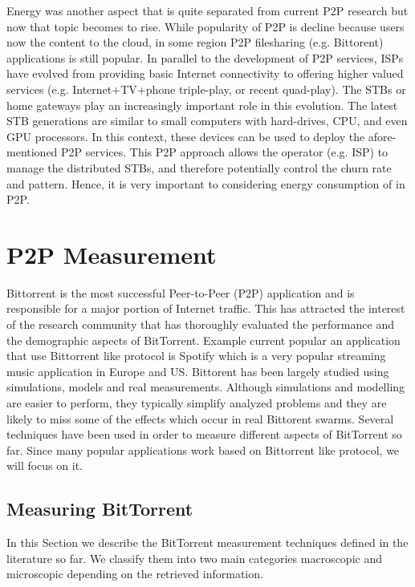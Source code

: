 Energy was another aspect that is quite separated from current P2P research but now that topic becomes to rise. 
While popularity of P2P is decline because users now the content to the cloud, in some region P2P filesharing (e.g. Bittorent) applications is still popular.
In parallel to the development of P2P services, ISPs have evolved from providing basic Internet connectivity to offering higher valued services (e.g. Internet+TV+phone triple-play, or recent quad-play). 
The STBs or home gateways play an increasingly important role in this evolution. 
The latest STB generations are similar to small computers with hard-drives, CPU, and even GPU processors. 
In this context, these devices can be used to deploy the afore-mentioned P2P services. 
This P2P approach allows the operator (e.g. ISP) to manage the distributed STBs, and therefore potentially control the churn rate and pattern. 
Hence, it is very important to considering energy consumption of in P2P.





\section{P2P Measurement}

Bittorrent is the most successful Peer-to-Peer (P2P) application and is responsible for a major portion of Internet traffic. 
This has attracted the interest of the research community that has thoroughly evaluated the performance and the demographic aspects of BitTorrent. 
Example current popular an application that use Bittorrent like protocol is Spotify which is a very popular streaming music application in Europe and US.
Bittorent has been largely studied using simulations, models and real measurements. 
Although simulations and modelling are easier to perform, they typically simplify analyzed problems and they are likely to miss some of the effects which occur in real Bittorent swarms. 
Several techniques have been used in order to measure different aspects of BitTorrent so far. 
Since many popular applications work based on Bittorrent like protocol, we will focus on it.

\subsection{Measuring BitTorrent}
In this Section we describe the BitTorrent measurement techniques defined in the literature so far. 
We classify them into two main categories macroscopic and microscopic depending on the retrieved information. 

